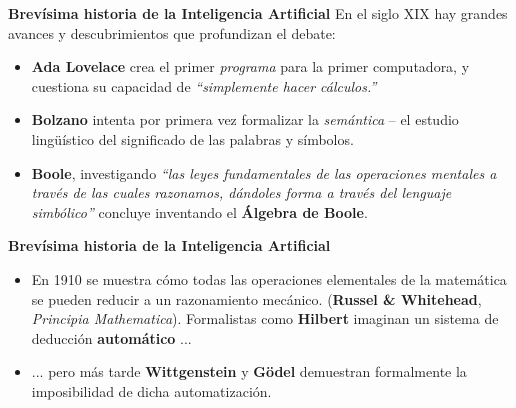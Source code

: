 \documentclass{beamer}
\begin{document}
\begin{frame}{\bfseries Brevísima historia de la Inteligencia Artificial}
En el siglo XIX hay grandes avances y descubrimientos que profundizan el debate:
\begin{itemize}
    \item \textbf{Ada Lovelace} crea el primer \textit{programa} para la primer computadora, y cuestiona su capacidad de \textit{``simplemente hacer cálculos.''}
    \item \textbf{Bolzano} intenta por primera vez formalizar la \textit{semántica} -- el estudio lingüístico del significado de las palabras y símbolos.
    \item \textbf{Boole}, investigando \textit{``las leyes fundamentales de las operaciones mentales a través de las cuales razonamos, dándoles forma a través del lenguaje simbólico''} concluye inventando el \textbf{Álgebra de Boole}.
\end{itemize}
\end{frame}

\begin{frame}{\bfseries Brevísima historia de la Inteligencia Artificial}
\begin{itemize}
    \item En 1910 se muestra cómo todas las operaciones elementales de la matemática se pueden reducir a un razonamiento mecánico. (\textbf{Russel \& Whitehead}, \textit{Principia Mathematica}). Formalistas como \textbf{Hilbert} imaginan un sistema de deducción \textbf{automático} ...
    \item<2-> ... pero más tarde \textbf{Wittgenstein} y \textbf{Gödel} demuestran formalmente la imposibilidad de dicha automatización.
\end{itemize}
\end{frame}
\end{document}
